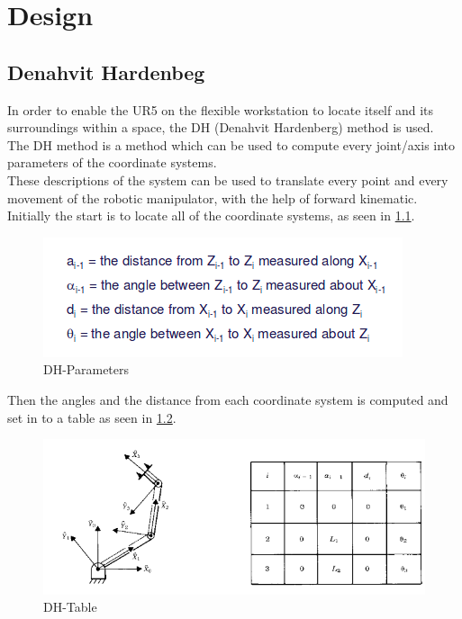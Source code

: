 \chapter{Design}

\section{Denahvit Hardenbeg}

In order to enable the UR5 on the flexible workstation to locate itself and its surroundings within a space, the DH (Denahvit Hardenberg) method is used.\\ 
The DH method is a method which can be used to compute every joint/axis into parameters of the coordinate systems.\\
These descriptions of the system can be used to translate every point and every movement of the robotic manipulator, with the help of forward kinematic.\\
Initially the start is to locate all of the coordinate systems, as seen in \ref{fig:DH-Parameters}.\\ 
\begin{figure}[h]
    \centering
    \includegraphics[scale=0.65]{Design/DH.png}
    \caption{DH-Parameters \cite{DH}} 
    \label{fig:DH-Parameters} 
\end{figure}

\newpage

Then the angles and the distance from each coordinate system is computed and set in to a table as seen in \ref{fig:DH-Table}.

\begin{figure}[h]
    \centering
    \includegraphics[scale=0.5]{Design/DH1.png}
    \caption{DH-Table \cite{DH}} 
    \label{fig:DH-Table} 
\end{figure}


